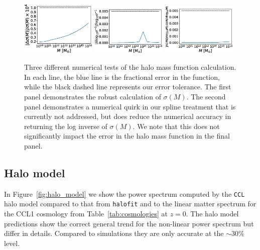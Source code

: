 \documentclass[\docopts]{\docclass}
\newcommand{\ccl}{{\tt CCL}\xspace}
\newcommand{\halofit}{{\tt halofit}\xspace}
\begin{document}
\begin{figure}
\includegraphics[width=0.32\textwidth]{hmf_model1}
\includegraphics[width=0.32\textwidth]{hmf_model1_b}
\includegraphics[width=0.32\textwidth]{hmf_model1_c}
\caption{Three different numerical tests of the halo mass function calculation. In each line, the blue line is the fractional error in the function, while the black dashed line represents our error tolerance. The first panel demonstrates the robust calculation of $\sigma(M)$. The second panel demonstrates a numerical quirk in our spline treatment that is currently not addressed, but does reduce the numerical accuracy in returning the log inverse of $\sigma(M)$. We note that this does not significantly impact the error in the halo mass function in the final panel.}
\label{fig:hmf}
\end{figure}

\subsection{Halo model}
\label{sec:halo_model_verification}

In Figure~\ref{fig:halo_model} we show the power spectrum computed by the \ccl halo model compared to that from \halofit and to the linear matter spectrum for the CCL1 cosmology from Table~\ref{tab:cosmologies} at $z=0$. The halo model predictions show the correct general trend for the non-linear power spectrum but differ in details. Compared to simulations they are only accurate at the $\sim 30\%$ level.
\end{document}
